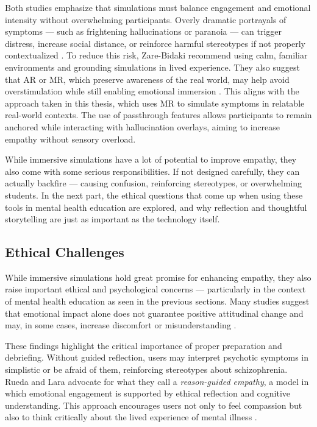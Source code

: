 \vspace{1em}

Both studies emphasize that simulations must balance engagement and emotional intensity without overwhelming participants. Overly dramatic portrayals of symptoms — such as frightening hallucinations or paranoia — can trigger distress, increase social distance, or reinforce harmful stereotypes if not properly contextualized \cite{Ando2011, Chaffin2013, Zare-Bidaki2022}. To reduce this risk, Zare-Bidaki \cite{Zare-Bidaki2022} recommend using calm, familiar environments and grounding simulations in lived experience. They also suggest that AR or MR, which preserve awareness of the real world, may help avoid overstimulation while still enabling emotional immersion \cite{Zare-Bidaki2022}. This aligns with the approach taken in this thesis, which uses MR to simulate symptoms in relatable real-world contexts. The use of passthrough features allows participants to remain anchored while interacting with hallucination overlays, aiming to increase empathy without sensory overload.

\vspace{1em}

While immersive simulations have a lot of potential to improve empathy, they also come with some serious responsibilities. If not designed carefully, they can actually backfire — causing confusion, reinforcing stereotypes, or overwhelming students. In the next part, the ethical questions that come up when using these tools in mental health education are explored, and why reflection and thoughtful storytelling are just as important as the technology itself.

\subsection{Ethical Challenges}
\label{sec:ethicalchallenges}

While immersive simulations hold great promise for enhancing empathy, they also raise important ethical and psychological concerns — particularly in the context of mental health education as seen in the previous sections. Many studies suggest that emotional impact alone does not guarantee positive attitudinal change and may, in some cases, increase discomfort or misunderstanding \cite{Ando2011}.

\vspace{1em}

These findings highlight the critical importance of proper preparation and debriefing. Without guided reflection, users may interpret psychotic symptoms in simplistic or be afraid of them, reinforcing stereotypes about schizophrenia. Rueda and Lara \cite{Rueda2020} advocate for what they call a \textit{reason-guided empathy}, a model in which emotional engagement is supported by ethical reflection and cognitive understanding. This approach encourages users not only to feel compassion but also to think critically about the lived experience of mental illness \cite{Ando2011, Rueda2020}. 

